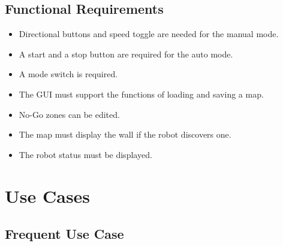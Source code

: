 \documentclass[11pt, a4paper]{report}
\begin{document}
\subsection{Functional Requirements}
\begin{itemize}
	\item Directional buttons and speed toggle are needed for the manual mode.
	\item A start and a stop button are required for the auto mode.
	\item A mode switch is required.
	\item The GUI must support the functions of loading and saving a map.
	\item No-Go zones can be edited.
	\item The map must display the wall if the robot discovers one.
	\item The robot status must be displayed.
\end{itemize}

\section{Use Cases}
\subsection{Frequent Use Case}
\end{document}
